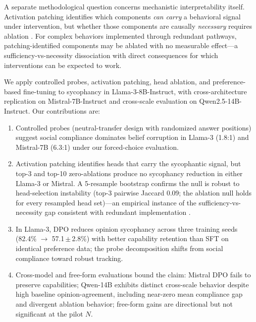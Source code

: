 \documentclass{article}
\begin{document}
A separate methodological question concerns mechanistic interpretability itself. Activation patching \citep{wang2022interpretability} identifies which components \emph{can carry} a behavioral signal under intervention, but whether those components are causally \emph{necessary} requires ablation \citep{heimersheim2024patching}. For complex behaviors implemented through redundant pathways, patching-identified components may be ablated with no measurable effect---a sufficiency-vs-necessity dissociation with direct consequences for which interventions can be expected to work.

We apply controlled probes, activation patching, head ablation, and preference-based fine-tuning to sycophancy in Llama-3-8B-Instruct, with cross-architecture replication on Mistral-7B-Instruct and cross-scale evaluation on Qwen2.5-14B-Instruct. Our contributions are:
\begin{enumerate}
  \item Controlled probes (neutral-transfer design with randomized answer positions) suggest social compliance dominates belief corruption in Llama-3 (1.8:1) and Mistral-7B (6.3:1) under our forced-choice evaluation.
  \item Activation patching identifies heads that carry the sycophantic signal, but top-3 and top-10 zero-ablations produce no sycophancy reduction in either Llama-3 or Mistral. A 5-resample bootstrap confirms the null is robust to head-selection instability (top-3 pairwise Jaccard 0.09; the ablation null holds for every resampled head set)---an empirical instance of the sufficiency-vs-necessity gap \citep{heimersheim2024patching} consistent with redundant implementation \citep{mcgrath2023hydra, rushing2024explorations}.
  \item In Llama-3, DPO reduces opinion sycophancy across three training seeds (82.4\% $\to$ 57.1\,$\pm$\,2.8\%) with better capability retention than SFT on identical preference data; the probe decomposition shifts from social compliance toward robust tracking.
  \item Cross-model and free-form evaluations bound the claim: Mistral DPO fails to preserve capabilities; Qwen-14B exhibits distinct cross-scale behavior despite high baseline opinion-agreement, including near-zero mean compliance gap and divergent ablation behavior; free-form gains are directional but not significant at the pilot $N$.
\end{enumerate}
\end{document}
